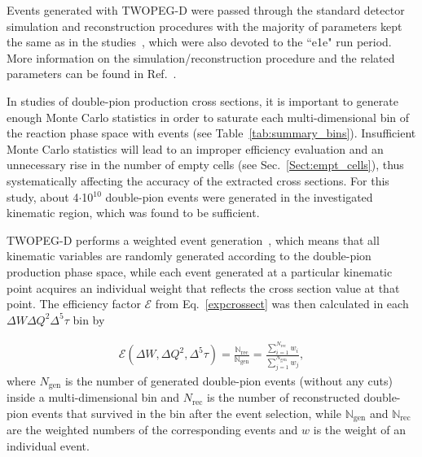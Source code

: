 \documentclass[prc,twocolumn,superscriptaddress,showpacs,amssymb,amsmath,amsfonts,aps,nofootinbib]{revtex4-1}
\begin{document}
Events generated with TWOPEG-D were passed through the standard detector simulation and reconstruction procedures with the majority of parameters kept the same as in the studies~\cite{Fed_an_note:2017,Fed_paper_2018,Markov:2014,Ye_Tian:2017,CLAS:2022kta}, which were also devoted to the ``e1e" run period. More information on the simulation/reconstruction procedure and the related parameters can be found in Ref.\!~\cite{my_an_note:2020}.


In studies of double-pion production cross sections, it is important to generate enough Monte Carlo statistics in order to saturate each multi-dimensional bin of the reaction phase space with events (see Table~\ref{tab:summary_bins}). Insufficient Monte Carlo statistics will lead to an improper efficiency evaluation and an unnecessary rise in the number of empty cells (see Sec.\!~\ref{Sect:empt_cells}), thus systematically affecting the accuracy of the extracted cross sections. For this study, about 4$\cdot$10$^{10}$ double-pion events were generated in the investigated kinematic region, which was found to be sufficient.

TWOPEG-D performs a weighted event generation~\cite{twopeg}, which means that all kinematic variables are randomly generated according to the double-pion production phase space, while each event generated at a particular kinematic point acquires an individual weight that reflects the cross section value at that point.  The efficiency factor $\mathcal{E}$ from Eq.\!~\eqref{expcrossect} was then calculated in each $\Delta W\Delta Q^2\Delta^{5}\tau$ bin by\vspace{-0.5em}

\begin{equation}
\begin{aligned}
\mathcal{E}(\Delta W, \Delta Q^2, \Delta^{5}\tau) = \frac{\mathbb{N}_{\text{rec}}}{\mathbb{N}_{\text{gen}}} =  \frac{\sum\limits_{i=1}^{N_{\text{rec}}} w_{i}}{\sum\limits_{j=1}^{N_{\text{gen}}} w_{j}} ,
\end{aligned}
\label{eq:eff}
\end{equation}
where $N_{\text{gen}}$ is the number of generated double-pion events (without any cuts) inside a multi-dimensional bin and $N_{\text{rec}}$ is the number of reconstructed double-pion events that survived in the bin after the event selection, while $\mathbb{N}_{\text{gen}}$ and  $\mathbb{N}_{\text{rec}}$ are the weighted numbers of the corresponding events and $w$ is the weight of an individual event.
\end{document}
